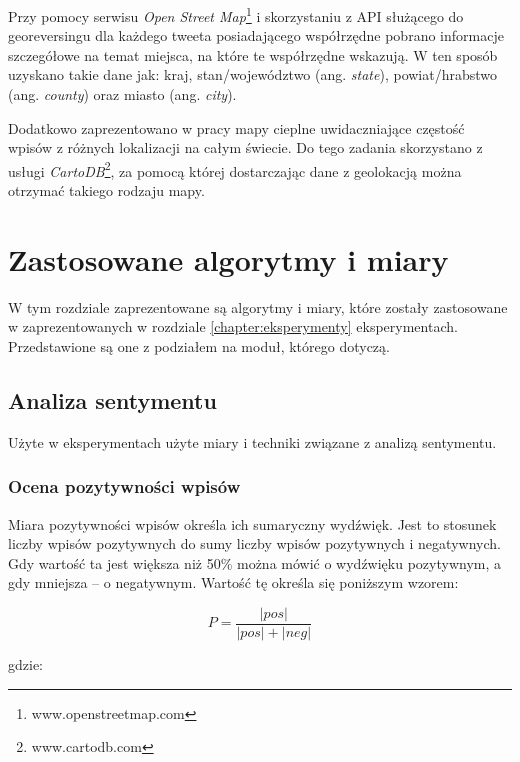 Przy pomocy serwisu \textit{Open Street Map}\footnote{www.openstreetmap.com} i
skorzystaniu z API służącego do georeversingu dla każdego tweeta posiadającego
współrzędne pobrano informacje szczegółowe na temat miejsca, na które te
współrzędne wskazują. W ten sposób uzyskano takie dane jak: kraj,
stan/województwo (ang. \textit{state}), powiat/hrabstwo (ang. \textit{county})
oraz miasto (ang. \textit{city}).

Dodatkowo zaprezentowano w pracy mapy cieplne uwidaczniające częstość wpisów z
różnych lokalizacji na całym świecie. Do tego zadania skorzystano z usługi
\textit{CartoDB}\footnote{www.cartodb.com}, za pomocą której dostarczając dane
z geolokacją można otrzymać takiego rodzaju mapy.




\section{Zastosowane algorytmy i miary}
\label{section:wielkosciwykorzystywane}
W tym rozdziale zaprezentowane są algorytmy i miary, które zostały zastosowane w
zaprezentowanych w rozdziale \ref{chapter:eksperymenty} eksperymentach.
Przedstawione są one z podziałem na moduł, którego dotyczą.

\subsection{Analiza sentymentu}
Użyte w eksperymentach użyte miary i techniki związane z analizą sentymentu.

\subsubsection{Ocena pozytywności wpisów}
\label{subsection:ocenapozytywnosci}
Miara pozytywności wpisów określa ich sumaryczny wydźwięk. Jest to stosunek
liczby wpisów pozytywnych do sumy liczby wpisów pozytywnych i negatywnych. Gdy
wartość ta jest większa niż 50\% można mówić o wydźwięku pozytywnym, a gdy
mniejsza -- o negatywnym. Wartość tę określa się poniższym wzorem: 

\begin{equation}
\label{equation:pozytywnosc}
P = \frac{|pos|}{|pos| + |neg|}
\end{equation}

gdzie:

